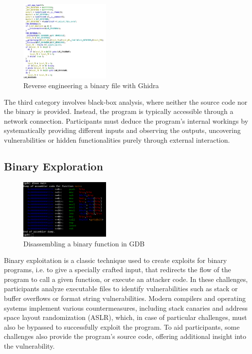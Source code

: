 \documentclass[conference]{IEEEtran}
\begin{document}
\begin{figure}[htbp]
	\centering
	\includegraphics[width=0.4\textwidth]{fig/ghidra.png}
	\caption{Reverse engineering a binary file with Ghidra}
	\label{fig-ghidra}
\end{figure}

The third category involves black-box analysis, where neither the source code
nor the binary is provided. Instead, the program is typically accessible
through a network connection. Participants must deduce the program's internal
workings by systematically providing different inputs and observing the
outputs, uncovering vulnerabilities or hidden functionalities purely through
external interaction.

\subsection{Binary Exploration}

\begin{figure}[htbp]
	\centering
	\includegraphics[width=0.4\textwidth]{fig/gdb.png}
	\caption{Disassembling a binary function in GDB}
	\label{fig-gdb}
\end{figure}

Binary exploitation is a classic technique used to create exploits for binary
programs, i.e. to give a specially crafted input, that redirects the flow
of the program to call a given function, or execute an attacker code.
In these challenges, participants analyze executable files to
identify vulnerabilities such as stack or buffer overflows
\cite{lhee2003}
or format string
vulnerabilities.
Modern compilers and operating systems implement various countermeasures,
including stack canaries and address space layout randomization (ASLR), which,
in case of particular challenges,
must also be bypassed to successfully exploit the program. To aid participants, some
challenges also provide the program’s source code, offering additional insight
into the vulnerability.
\end{document}

